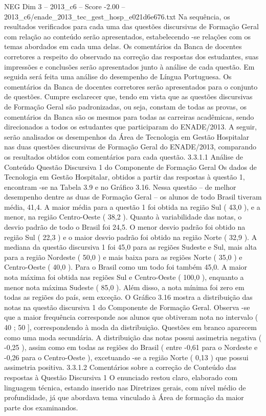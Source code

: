 \begin{textsample}{NEG Dim 3 – 2013\_c6 – Score -2.00 – 2013\_c6/enade\_2013\_tec\_gest\_hosp\_e021d6e676.txt}
Na sequência, os resultados verificados para cada uma das questões discursivas de Formação Geral com relação ao conteúdo serão apresentados, estabelecendo -se relações com os temas abordados em cada uma delas.
Os comentários da Banca de docentes corretores a respeito do observado na correção das respostas dos estudantes, suas impressões e conclusões serão apresentados junto à análise de cada questão.
Em seguida será feita uma análise do desempenho de Língua Portuguesa.
Os comentários da Banca de docentes corretores serão apresentados para o conjunto de questões.
Cumpre esclarecer que, tendo em vista que as questões discursivas de Formação Geral são padronizadas, ou seja, constam de todas as provas, os comentários da Banca são os mesmos para todas as carreiras acadêmicas, sendo direcionados a todos os estudantes que participaram do ENADE/2013.
A seguir, serão analisados os desempenhos da Área de Tecnologia em Gestão Hospitalar nas duas questões discursivas de Formação Geral do ENADE/2013, comparando os resultados obtidos com comentários para cada questão. 3.3.1.1 Análise de Conteúdo Questão Discursiva 1 do Componente de Formação Geral Os dados de Tecnologia em Gestão Hospitalar, obtidos a partir das respostas à questão 1, encontram -se na Tabela 3.9 e no Gráfico 3.16.
Nessa questão – de melhor desempenho dentre as duas de Formação Geral – os alunos de todo Brasil tiveram média, 41,4.
A maior média para a questão 1 foi obtida na região Sul ( 43,0 ), e a menor, na região Centro-Oeste ( 38,2 ).
Quanto à variabilidade das notas, o desvio padrão de todo o Brasil foi 24,5.
O menor desvio padrão foi obtido na região Sul ( 22,3 ) e o maior desvio padrão foi obtido na região Norte ( 32,9 ).
A mediana da questão discursiva 1 foi 45,0 para as regiões Sudeste e Sul, mais alta para a região Nordeste ( 50,0 ) e mais baixa para as regiões Norte ( 35,0 ) e Centro-Oeste ( 40,0 ).
Para o Brasil como um todo foi também 45,0.
A maior nota máxima foi obtida nas regiões Sul e Centro-Oeste ( 100,0 ), enquanto a menor nota máxima Sudeste ( 85,0 ).
Além disso, a nota mínima foi zero em todas as regiões do país, sem exceção.
O Gráfico 3.16 mostra a distribuição das notas na questão discursiva 1 do Componente de Formação Geral.
Observa -se que a maior frequência corresponde aos alunos que obtiveram nota no intervalo ( 40 ; 50 ], correspondendo à moda da distribuição.
Questões em branco aparecem como uma moda secundária.
A distribuição das notas possui assimetria negativa ( -0,25 ), assim como em todas as regiões do Brasil ( entre -0,61 para o Nordeste e -0,26 para o Centro-Oeste ), excetuando -se a região Norte ( 0,13 ) que possui assimetria positiva. 3.3.1.2 Comentários sobre a correção de Conteúdo das respostas à Questão Discursiva 1 O enunciado restou claro, elaborado com linguagem técnica, estando inserido nas Diretrizes gerais, com nível médio de profundidade, já que abordava tema vinculado à Área de formação da maior parte dos examinandos.

\end{textsample}
